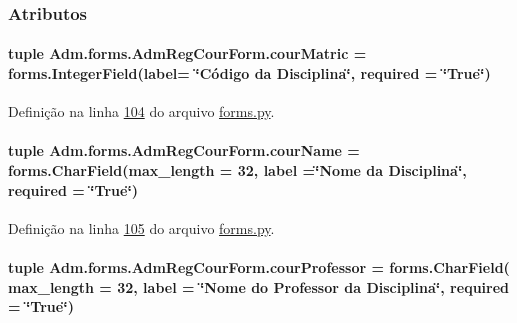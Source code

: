 \subsubsection{Atributos}
\hypertarget{classAdm_1_1forms_1_1AdmRegCourForm_a5030e7e3ac46b325e10adc6d39ea9736}{
\paragraph[{cour\-Matric}]{\setlength{\rightskip}{0pt plus 5cm}tuple Adm.\-forms.\-Adm\-Reg\-Cour\-Form.\-cour\-Matric = forms.\-Integer\-Field(label= \char`\"{}Código da Disciplina\char`\"{}, required = \char`\"{}True\char`\"{})\hspace{0.3cm}{\ttfamily [static]}}}\label{classAdm_1_1forms_1_1AdmRegCourForm_a5030e7e3ac46b325e10adc6d39ea9736}


Definição na linha \hyperlink{Adm_2forms_8py_source_l00104}{104} do arquivo \hyperlink{Adm_2forms_8py_source}{forms.\-py}.

\hypertarget{classAdm_1_1forms_1_1AdmRegCourForm_afc325feb749069ea57387630cc0acc5a}{
\paragraph[{cour\-Name}]{\setlength{\rightskip}{0pt plus 5cm}tuple Adm.\-forms.\-Adm\-Reg\-Cour\-Form.\-cour\-Name = forms.\-Char\-Field(max\-\_\-length = 32, label =\char`\"{}Nome da Disciplina\char`\"{}, required = \char`\"{}True\char`\"{})\hspace{0.3cm}{\ttfamily [static]}}}\label{classAdm_1_1forms_1_1AdmRegCourForm_afc325feb749069ea57387630cc0acc5a}


Definição na linha \hyperlink{Adm_2forms_8py_source_l00105}{105} do arquivo \hyperlink{Adm_2forms_8py_source}{forms.\-py}.

\hypertarget{classAdm_1_1forms_1_1AdmRegCourForm_a6fcfad36a149364899dc7c95f239691f}{
\paragraph[{cour\-Professor}]{\setlength{\rightskip}{0pt plus 5cm}tuple Adm.\-forms.\-Adm\-Reg\-Cour\-Form.\-cour\-Professor = forms.\-Char\-Field( max\-\_\-length = 32, label = \char`\"{}Nome do Professor da Disciplina\char`\"{}, required = \char`\"{}True\char`\"{})\hspace{0.3cm}{\ttfamily [static]}}}\label{classAdm_1_1forms_1_1AdmRegCourForm_a6fcfad36a149364899dc7c95f239691f}


